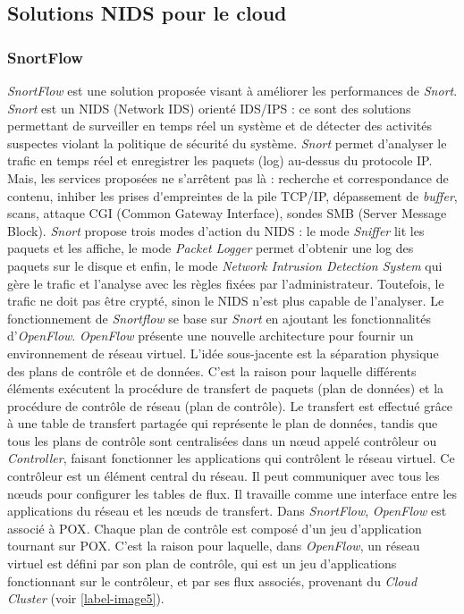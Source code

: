 \subsection{Solutions NIDS pour le cloud}

\subsubsection{SnortFlow}

\textit{SnortFlow} \cite{snortflow} est une solution proposée visant à améliorer les performances de \textit{Snort}. \textit{Snort} est un NIDS (Network IDS) orienté IDS/IPS : ce sont des solutions permettant de surveiller en temps réel un système et de détecter des activités suspectes violant la politique de sécurité du système. \textit{Snort} permet d'analyser le trafic en temps réel et enregistrer les paquets (log) au-dessus du protocole IP. Mais, les services proposées ne s'arrêtent pas là : 
recherche et correspondance de contenu, inhiber les \gls{prises d'empreintes} de la pile TCP/IP, dépassement de \textit{buffer}, scans, attaque CGI (Common Gateway Interface), sondes SMB (Server Message Block).
\textit{Snort} propose trois modes d'action du NIDS : le mode \textit{Sniffer} lit les paquets et les affiche, le mode \textit{Packet Logger} permet d'obtenir une log des paquets sur le disque et enfin, le mode \textit{Network Intrusion Detection System} qui gère le trafic et l'analyse avec les règles fixées par l'administrateur. Toutefois, le trafic ne doit pas être crypté, sinon le NIDS n'est plus capable de l'analyser.
Le fonctionnement de \textit{Snortflow} se base sur \textit{Snort} en ajoutant les fonctionnalités d'\textit{\gls{OpenFlow}}. \textit{OpenFlow} présente une nouvelle architecture pour fournir un environnement de réseau virtuel. L'idée sous-jacente est la séparation physique des plans de contrôle et de données. C'est la raison pour laquelle différents éléments exécutent la procédure de transfert de paquets (plan de données) et la procédure de contrôle de réseau (plan de contrôle). Le transfert est effectué grâce à une table de transfert partagée qui représente le plan de données, tandis que tous les plans de contrôle sont centralisées dans un nœud appelé contrôleur ou \textit{Controller}, faisant fonctionner les applications qui contrôlent le réseau virtuel. Ce contrôleur est un élément central du réseau. Il peut communiquer avec tous les nœuds pour configurer les tables de flux. Il travaille comme une interface entre les applications du réseau et les nœuds de transfert. Dans \textit{SnortFlow}, \textit{OpenFlow} est associé à \gls{POX}. Chaque plan de contrôle est composé d'un jeu d'application tournant sur POX. C'est la raison pour laquelle, dans \textit{OpenFlow}, un réseau virtuel est défini par son plan de contrôle, qui est un jeu d'applications fonctionnant sur le contrôleur, et par ses flux associés, provenant du \textit{Cloud Cluster} (voir \ref{label-image5}).

